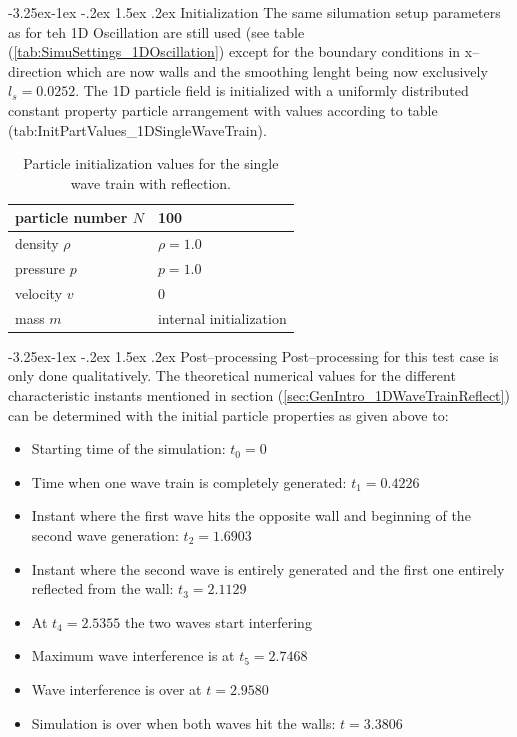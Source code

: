 \documentclass[11pt,a4paper,twoside]{report}
\makeatletter
\renewcommand\paragraph{\@startsection{paragraph}{4}{\z@}%
  {-3.25ex\@plus -1ex \@minus -.2ex}%
  {1.5ex \@plus .2ex}%
  {\normalfont\normalsize\bfseries}}
\makeatother
\begin{document}
\paragraph{Initialization}
The same silumation setup parameters as for teh 1D Oscillation are still used (see table (\ref{tab:SimuSettings_1DOscillation}) except for the boundary conditions in x--direction which are now walls and the smoothing lenght being now exclusively $l_s=0.0252$.
The 1D particle field is initialized with a uniformly distributed constant property particle arrangement with values according to table (tab:InitPartValues\_1DSingleWaveTrain). 

\begin{table}[h] %
\label{tab:InitPartValues_1DSingleWaveTrain}
\centering

\begin{tabular}[c]{|l|p{5cm}|} %
\hline
\hline
particle number $N$ &  100\\
\hline
density $\rho$ &  $\rho=1.0$\\
\hline
pressure $p$ &  $p=1.0$\\
\hline
velocity $v$ & 0\\
\hline
mass $m$ & internal initialization\\
\hline
\hline
\end{tabular}
\caption[]{Particle initialization values for the single wave train with reflection.}

\end{table}

\paragraph{Post--processing}
Post--processing for this test case is only done qualitatively. The theoretical numerical values for the different characteristic instants mentioned in section (\ref{sec:GenIntro_1DWaveTrainReflect}) can be determined with the initial particle properties as given above to:
\begin{itemize}
 \item Starting time of the simulation: $t_0=0$
\item Time when one wave train is completely generated: $t_1=0.4226$
\item Instant where the first wave hits the opposite wall and beginning of the second wave generation: $t_2=1.6903$
\item Instant where the second wave is entirely generated and the first one entirely reflected from the wall: $t_3=2.1129$
\item At $t_4=2.5355$ the two waves start interfering
\item Maximum wave interference is at $t_5=2.7468$
\item Wave interference is over at $t=2.9580$
\item Simulation is over when both waves hit the walls: $t=3.3806$
\end{itemize}
\end{document}
